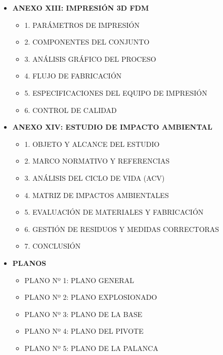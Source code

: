 \documentclass[11pt,a4paper]{article}
\begin{document}
\begin{itemize}[label={}, leftmargin=0cm, itemsep=1.2em]
\begin{itemize}[label=\color{ArthroTeal}\textbullet, leftmargin=0.6cm, itemsep=0.5em, topsep=0.3cm]
        \newpage
        \item \textbf{ANEXO XIII: IMPRESIÓN 3D FDM} 
        \begin{itemize}[label=\color{ArthroGray}\circ, leftmargin=0.5cm, itemsep=0.2em, topsep=0.1cm]
            \small
            \item 1. PARÁMETROS DE IMPRESIÓN 
            \item 2. COMPONENTES DEL CONJUNTO 
            \item 3. ANÁLISIS GRÁFICO DEL PROCESO
            \item 4. FLUJO DE FABRICACIÓN
            \item 5. ESPECIFICACIONES DEL EQUIPO DE IMPRESIÓN 
            \item 6. CONTROL DE CALIDAD 
        \end{itemize}

     \item \textbf{ANEXO XIV: ESTUDIO DE IMPACTO AMBIENTAL} 
        \begin{itemize}[label=\color{ArthroGray}\circ, leftmargin=0.5cm, itemsep=0.2em, topsep=0.1cm]
            \small
            \item 1. OBJETO Y ALCANCE DEL ESTUDIO 
            \item 2. MARCO NORMATIVO Y REFERENCIAS
            \item 3. ANÁLISIS DEL CICLO DE VIDA (ACV) 
            \item 4. MATRIZ DE IMPACTOS AMBIENTALES 
            \item 5. EVALUACIÓN DE MATERIALES Y FABRICACIÓN
            \item 6. GESTIÓN DE RESIDUOS Y MEDIDAS CORRECTORAS
            \item 7. CONCLUSIÓN 
        \end{itemize}

\vspace{0.5cm}

    \item \Large\textbf{\color{ArthroNavy}PLANOS} 
    \begin{itemize}[label=\color{ArthroTeal}\textbullet, leftmargin=0.6cm, itemsep=0.3em, topsep=0.3cm]
        \normalsize
        \item PLANO Nº 1: PLANO GENERAL 
        \item PLANO Nº 2: PLANO EXPLOSIONADO  
        \item PLANO Nº 3: PLANO DE LA BASE   
        \item PLANO Nº 4: PLANO DEL PIVOTE  
        \item PLANO Nº 5: PLANO DE LA PALANCA  
    \end{itemize}


\end{itemize}
\end{itemize}
\end{document}
